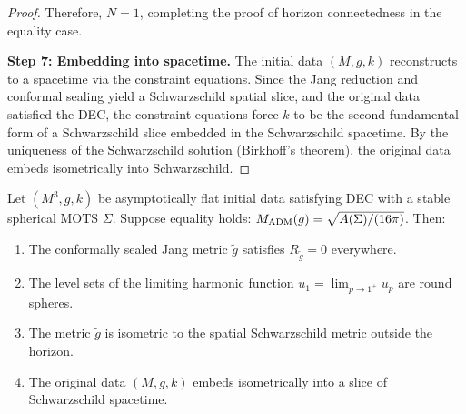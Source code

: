 \begin{proof}
Therefore, $N = 1$, completing the proof of horizon connectedness in the equality case.

\textbf{Step 7: Embedding into spacetime.}
The initial data $(M, g, k)$ reconstructs to a spacetime via the constraint equations. Since the Jang reduction and conformal sealing yield a Schwarzschild spatial slice, and the original data satisfied the DEC, the constraint equations force $k$ to be the second fundamental form of a Schwarzschild slice embedded in the Schwarzschild spacetime. By the uniqueness of the Schwarzschild solution (Birkhoff's theorem), the original data embeds isometrically into Schwarzschild.
\end{proof}

\begin{lemma}\label{lem:StaticVacuumBootstrap}
Let $(M^3, g, k)$ be asymptotically flat initial data satisfying DEC with a stable spherical MOTS $\Sigma$. Suppose equality holds: $M_{\mathrm{ADM}}(g) = \sqrt{A(\Sigma)/(16\pi)}$. Then:
\begin{enumerate}
    \item[\textup{(a)}] The conformally sealed Jang metric $\tilde{g}$ satisfies $R_{\tilde{g}} = 0$ everywhere.
    \item[\textup{(b)}] The level sets of the limiting harmonic function $u_1 = \lim_{p \to 1^+} u_p$ are round spheres.
    \item[\textup{(c)}] The metric $\tilde{g}$ is isometric to the spatial Schwarzschild metric outside the horizon.
    \item[\textup{(d)}] The original data $(M, g, k)$ embeds isometrically into a slice of Schwarzschild spacetime.
\end{enumerate}
\end{lemma}

